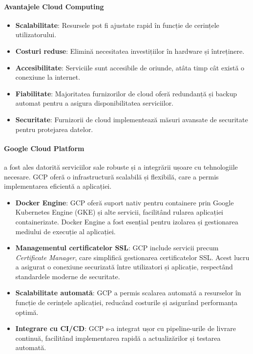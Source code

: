 \documentclass[titlepage,12pt]{article}
\begin{document}
\paragraph{Avantajele Cloud Computing}
\begin{itemize}
    \item \textbf{Scalabilitate}: Resursele pot fi ajustate rapid în funcție de cerințele utilizatorului.
    \item \textbf{Costuri reduse}: Elimină necesitatea investițiilor în hardware și întreținere.
    \item \textbf{Accesibilitate}: Serviciile sunt accesibile de oriunde, atâta timp cât există o conexiune la internet.
    \item \textbf{Fiabilitate}: Majoritatea furnizorilor de cloud oferă redundanță și backup automat pentru a asigura disponibilitatea serviciilor.
    \item \textbf{Securitate}: Furnizorii de cloud implementează măsuri avansate de securitate pentru protejarea datelor.
\end{itemize}

\paragraph{Google Cloud Platform}
a fost ales datorită serviciilor sale robuste și a integrării ușoare cu tehnologiile necesare. \ac {GCP} oferă o infrastructură scalabilă și flexibilă, care a permis implementarea eficientă a aplicației.

\begin{itemize}
    \item \textbf{Docker Engine}: GCP oferă suport nativ pentru containere prin Google Kubernetes Engine (GKE) și alte servicii, facilitând rularea aplicației containerizate. Docker Engine a fost esențial pentru izolarea și gestionarea mediului de execuție al aplicației.
    \item \textbf{Managementul certificatelor SSL}: GCP include servicii precum \textit{Certificate Manager}, care simplifică gestionarea certificatelor SSL. Acest lucru a asigurat o conexiune securizată între utilizatori și aplicație, respectând standardele moderne de securitate.
    \item \textbf{Scalabilitate automată}: GCP a permis scalarea automată a resurselor în funcție de cerințele aplicației, reducând costurile și asigurând performanța optimă.
    \item \textbf{Integrare cu CI/CD}: GCP s-a integrat ușor cu pipeline-urile de livrare continuă, facilitând implementarea rapidă a actualizărilor și testarea automată.
\end{itemize}
\end{document}
